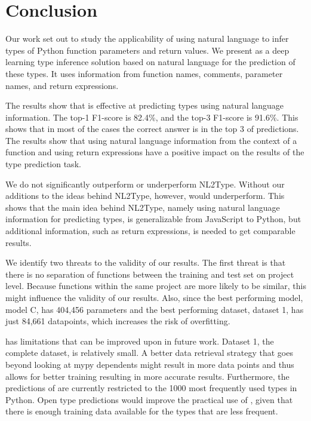 \section{Conclusion}
Our work set out to study the applicability of using natural language to infer types of Python function parameters and return values.
We present \dltpy{} as a deep learning type inference solution based on natural language for the prediction of these types.
It uses information from function names, comments, parameter names, and return expressions. 

The results show that \dltpy{} is effective at predicting types using natural language information. The top-1 F1-score is 82.4\%, and the top-3 F1-score is 91.6\%. This shows that in most of the cases the correct answer is in the top 3 of predictions. The results show that using natural language information from the context of a function and using return expressions have a positive impact on the results of the type prediction task.

We do not significantly outperform or underperform NL2Type. Without our additions to the ideas behind NL2Type, however, \dltpy{} would underperform. This shows that the main idea behind NL2Type, namely using natural language information for predicting types, is generalizable from JavaScript to Python, but additional information, such as return expressions, is needed to get comparable results.

We identify two threats to the validity of our results. The first threat is that there is no separation of functions between the training and test set on project level. Because functions within the same project are more likely to be similar, this might influence the validity of our results. Also, since the best performing model, model C, has 404,456 parameters and the best performing dataset, dataset 1, has just 84,661 datapoints, which increases the risk of overfitting.

\dltpy{} has limitations that can be improved upon in future work. Dataset 1, the complete dataset, is relatively small. A better data retrieval strategy that goes beyond looking at mypy dependents might result in more data points and thus allows for better training resulting in more accurate results. Furthermore, the predictions of \dltpy{} are currently restricted to the 1000 most frequently used types in Python. Open type predictions would improve the practical use of \dltpy{}, given that there is enough training data available for the types that are less frequent.
